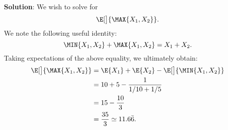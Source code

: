 \begin{Example}
\begin{enumerate}[(a)]
              \textbf{Solution}: We wish to solve for
              \[ \E[\big]{\MAX{X_1,X_2}}. \]
              We note the following useful identity:
              \[ \MIN{X_1,X_2}+\MAX{X_1,X_2}=X_1+X_2. \]
              Taking expectations of the above equality, we ultimately obtain:
              \begin{align*}
                  \E[\big]{\MAX{X_1,X_2}}
                   & =\E{X_1}+\E{X_2}-\E[\big]{\MIN{X_1,X_2}} \\
                   & =10+5-\frac{1}{1/10+1/5}                 \\
                   & =15-\frac{10}{3}                         \\
                   & =\frac{35}{3}\simeq 11.6\bar{6}.
              \end{align*}
    \end{enumerate}
\end{Example}
